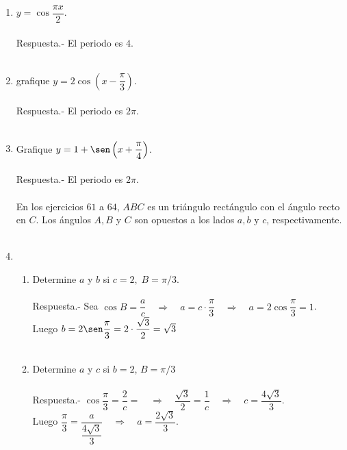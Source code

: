 \begin{enumerate}
\item $y = \cos \dfrac{\pi x}{2}$.\\\\
    Respuesta.-\; El periodo es $4$.\\\\ 

\item grafique $y = 2\cos\left(x - \dfrac{\pi}{3}\right)$.\\\\
    Respuesta.-\; El periodo es $2\pi$.\\\\ 

\item Grafique $y = 1 + \sen\left(x + \dfrac{\pi}{4}\right)$.\\\\
    Respuesta.-\; El periodo es $2\pi$.\\\\

En los ejercicios $61$ a $64$, $ABC$ es un triángulo rectángulo con el ángulo recto en $C$. Los ángulos $A, B$ y $C$ son opuestos a los lados $a, b$ y $c$, respectivamente.\\\\

\item 
\begin{enumerate}[\bfseries a)]

    \item Determine $a$ y $b$ si $c = 2, \; B = \pi/3$.\\\\
	Respuesta.-\; Sea $\cos B = \dfrac{a}{c} \quad \Longrightarrow \quad a = c\cdot \dfrac{\pi}{3} \quad \Longrightarrow \quad a = 2\cos \dfrac{\pi}{3} = 1$.\\
	Luego $b = 2 \sen \dfrac{\pi}{3} = 2\cdot \dfrac{\sqrt{3}}{2} = \sqrt{3}$\\\\ 

    \item Determine $a$ y $c$ si $b = 2$, $B = \pi/3$\\\\
	Respuesta.-\; $\cos \dfrac{\pi}{3} = \dfrac{2}{c} = \quad \Longrightarrow \quad \dfrac{\sqrt{3}}{2} = \dfrac{1}{c} \quad \Longrightarrow \quad c = \dfrac{4\sqrt{3}}{3}$.\\
	Luego $\dfrac{\pi}{3} = \dfrac{a}{\dfrac{4\sqrt{3}}{3}} \quad \Longrightarrow \quad a = \dfrac{2\sqrt{3}}{3}$.\\\\


\end{enumerate}
\end{enumerate}
